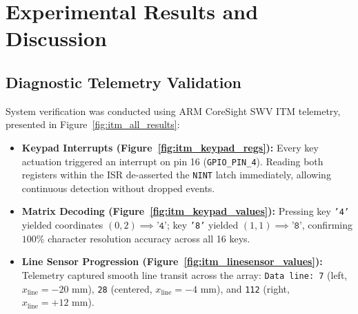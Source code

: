 \section{Experimental Results and Discussion}

\subsection{Diagnostic Telemetry Validation}
System verification was conducted using ARM CoreSight SWV ITM telemetry, presented in Figure~\ref{fig:itm_all_results}:
\begin{itemize}[noitemsep,topsep=1pt]
    \item \textbf{Keypad Interrupts (Figure~\ref{fig:itm_keypad_regs}):} Every key actuation triggered an interrupt on pin 16 (\texttt{GPIO\_PIN\_4}). Reading both registers within the ISR de-asserted the \texttt{NINT} latch immediately, allowing continuous detection without dropped events.
    \item \textbf{Matrix Decoding (Figure~\ref{fig:itm_keypad_values}):} Pressing key \texttt{'4'} yielded coordinates $(0, 2) \implies \texttt{'4'}$; key \texttt{'8'} yielded $(1, 1) \implies \texttt{'8'}$, confirming $100\%$ character resolution accuracy across all 16 keys.
    \item \textbf{Line Sensor Progression (Figure~\ref{fig:itm_linesensor_values}):} Telemetry captured smooth line transit across the array: \texttt{Data line: 7} (left, $x_{\text{line}} = -20\text{ mm}$), \texttt{28} (centered, $x_{\text{line}} = -4\text{ mm}$), and \texttt{112} (right, $x_{\text{line}} = +12\text{ mm}$).
\end{itemize}

